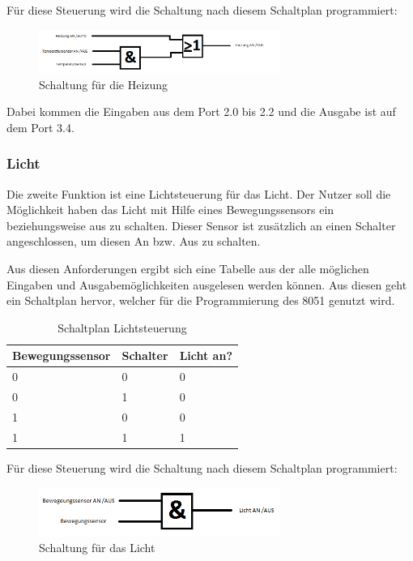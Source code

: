 Für diese Steuerung wird die Schaltung nach diesem Schaltplan programmiert:

\begin{figure}[htbp] 
  \centering
     \includegraphics[width=0.7\textwidth]{Heizungsschaltung.png}
  \caption{Schaltung für die Heizung}
  \label{fig:Bild1}
\end{figure}

Dabei kommen die Eingaben aus dem Port 2.0 bis 2.2 und die Ausgabe ist auf dem Port 3.4.

\subsubsection{Licht}
Die zweite Funktion ist eine Lichtsteuerung für das Licht. Der Nutzer soll die Möglichkeit haben das Licht mit Hilfe eines Bewegungssensors ein beziehungsweise aus zu schalten. Dieser Sensor ist zusätzlich an einen Schalter angeschlossen, um diesen An bzw. Aus zu schalten.
 
Aus diesen Anforderungen ergibt sich eine Tabelle aus der alle möglichen Eingaben und Ausgabemöglichkeiten ausgelesen werden können. Aus diesen geht ein Schaltplan hervor, welcher für die Programmierung des 8051 genutzt wird.

\begin{table}[htbp]
\centering
\caption{Schaltplan Lichtsteuerung}
\label{my-label}
\begin{tabular}{|l|l|l|}
\hline
\multicolumn{1}{|c|}{\textbf{Bewegungssensor}} & \multicolumn{1}{c|}{\textbf{Schalter}} & \multicolumn{1}{c|}{\textbf{Licht an?}} \\ \hline
 0 & 0 & 0 \\ \hline
 0 & 1 & 0 \\ \hline
 1 & 0 & 0 \\ \hline
 1 & 1 & 1 \\ \hline
\end{tabular}
\end{table}

Für diese Steuerung wird die Schaltung nach diesem Schaltplan programmiert:

\begin{figure}[htbp] 
  \centering
     \includegraphics[width=0.7\textwidth]{Lichtschaltung.png}
  \caption{Schaltung für das Licht}
  \label{fig:Bild2}
\end{figure}

